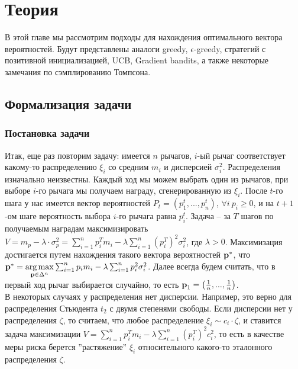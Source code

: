 \chapter{Теория} %

\label{Theory} %

\newcommand{\lrarr}{\lrarr}


В этой главе мы рассмотрим подходы для нахождения оптимального вектора вероятностей. Будут представлены аналоги greedy, $\epsilon$-greedy, стратегий с позитивной инициализацией, UCB, Gradient bandits, а также некоторые замечания по сэмплированию Томпсона.  

\section{Формализация задачи}

\subsection{Постановка задачи}

Итак, еще раз повторим задачу: имеется $n$ рычагов, $i$-ый рычаг соответствует какому-то распределению $\xi_i$ со средним $m_i$ и дисперсией $\sigma_i^2$. Распределения изначально неизвестны. Каждый ход мы можем выбрать один из рычагов, при выборе $i$-го рычага мы получаем награду, сгенерированную из $\xi_i$. После $t$-го шага у нас имеется вектор вероятностей $P_t = (p_1^t, ..., p_n^t)$, $\forall i \: p_i \geq 0$, и на $t+1$-ом шаге вероятность выбора $i$-го рычага равна $p_i^t$. Задача -- за $T$ шагов по получаемым наградам максимизировать $V = m_p - \lambda \cdot \sigma_p^2 = \sum_{i=1}^n p_i^T m_i - \lambda \sum_{i=1}^n (p_i^T)^2 \sigma_i^2$, где $\lambda > 0$. Максимизация достигается путем нахождения такого вектора вероятностей $\textbf{p}^*$, что $\textbf{p}^* = \underset{\textbf{p} \in \Delta^n}{\arg \max} \sum_{i=1}^n p_i m_i - \lambda \sum_{i=1}^n p_i^2 \sigma_i^2$. Далее всегда будем считать, что в первый ход рычаг выбирается случайно, то есть $\textbf{p}_1 = \left( \frac{1}{n}, ..., \frac{1}{n} \right)$. \\

В некоторых случаях у распределения нет дисперсии. Например, это верно для распределения Стьюдента $t_2$ с двумя степенями свободы. Если дисперсии нет у распределения $\zeta$, то считаем, что любое распределение $\xi_i \sim c_i \cdot \zeta$, и ставится задача максимизации $V = \sum_{i=1}^n p_i^T m_i - \lambda \sum_{i=1}^n (p_i^T)^2 c_i^2$, то есть в качестве меры риска берется ''растяжение'' $\xi_i$ относительного какого-то эталонного распределения $\zeta$.

